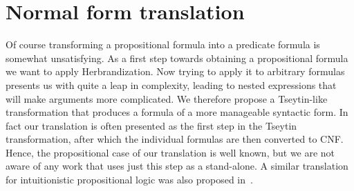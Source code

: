 \documentclass[a4paper,UKenglish,cleveref, autoref, thm-restate]{lipics-v2021}
\begin{document}
\section{Normal form translation}
\label{section:tseytin}

Of course transforming a propositional formula into a predicate formula is somewhat unsatisfying. As a first step towards obtaining a propositional formula we want to apply Herbrandization. Now trying to apply it to arbitrary formulas presents us with quite a leap in complexity, leading to nested expressions that will make arguments more complicated. We therefore propose a Tseytin-like transformation that produces a formula of a more manageable syntactic form. In fact our translation is often presented as the first step in the Tseytin transformation, after which the individual formulas are then converted to CNF.
Hence, the propositional case of our translation is well known, but we are not aware of any work that uses just this step as a stand-alone. A similar translation for intuitionistic propositional logic was also proposed in~\cite{statman1979intuitionistic}.
\end{document}
